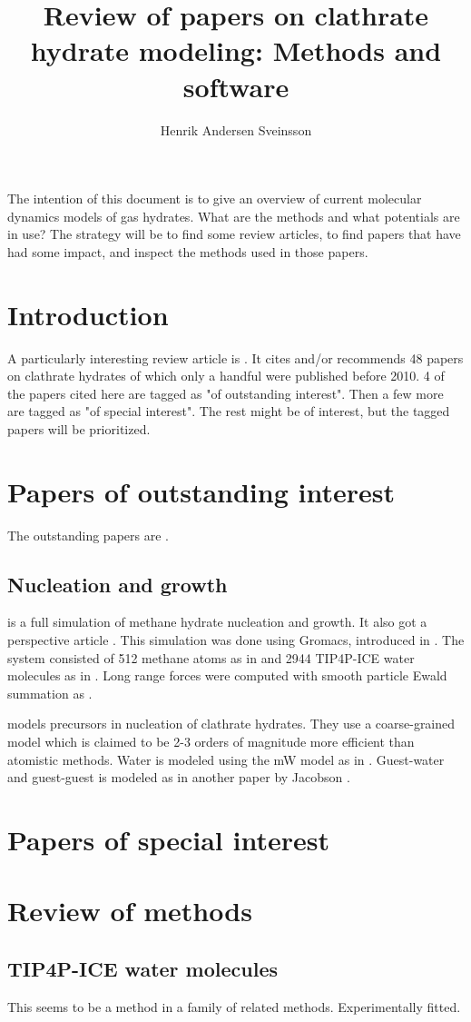 \documentclass[a4paper]{article}
\author{Henrik Andersen Sveinsson}
\title{Review of papers on clathrate hydrate modeling: Methods and software}
\begin{document}

\maketitle

The intention of this document is to give an overview of current molecular dynamics models of gas hydrates. What are the methods and what potentials are in use? The strategy will be to find some review articles, to find papers that have had some impact, and inspect the methods used in those papers. 

\section{Introduction}
A particularly interesting review article is \cite{Barnes2013}. It cites and/or recommends 48 papers on clathrate hydrates of which only a handful were published before 2010. 4 of the papers cited here are tagged as "of outstanding interest". Then a few more are tagged as "of special interest". The rest might be of interest, but the tagged papers will be prioritized. 


\section{Papers of outstanding interest}
The outstanding papers are \cite{Walsh2009, Matsumoto2002, Jacobson2010, Jensen2010}.

\subsection{Nucleation and growth}
\cite{Walsh2009} is a full simulation of methane hydrate nucleation and growth. It also got a perspective article \cite{Debenedetti2009}. This simulation was done using Gromacs, introduced in \cite{Hess2008}. The system consisted of 512 methane atoms as in \cite{Goodbody1991} and 2944 TIP4P-ICE water molecules as in \cite{Abascal2005}. Long range forces were computed with smooth particle Ewald summation as \cite{Essmann1995}.

\cite{Jacobson2010} models precursors in nucleation of clathrate hydrates. They use a coarse-grained model which is claimed to be 2-3 orders of magnitude more efficient than atomistic methods. Water is modeled using the mW model as in \cite{Molinero2009}. Guest-water and guest-guest is modeled as in another paper by Jacobson \cite{Jacobson2010a}. 

\section{Papers of special interest}

\section{Review of methods}

\subsection{TIP4P-ICE water molecules}
This seems to be a method in a family of related methods. Experimentally fitted. 


\end{document}
